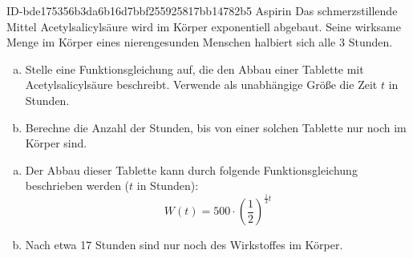 \begin{exercise}
      {ID-bde175356b3da6b16d7bbf255925817bb14782b5}
      {Aspirin}
  \ifproblem\problem
    Das schmerzstillende Mittel Acetylsalicylsäure wird im Körper
    exponentiell abgebaut. Seine wirksame Menge im Körper eines
    nierengesunden Menschen halbiert sich alle 3 Stunden.
    \begin{enumerate}[a)]
      \item Stelle eine Funktionsgleichung auf, die den Abbau
            einer Tablette mit  Acetylsalicylsäure
            beschreibt. Verwende als unabhängige Größe die Zeit
            $t$ in Stunden.
      \item Berechne die Anzahl der Stunden, bis von einer
            solchen Tablette nur noch  im Körper sind.
    \end{enumerate}
  \fi
  \ifoutcome\outcome
    \begin{enumerate}[a)]
      \item Der Abbau dieser Tablette kann durch folgende
            Funktionsgleichung beschrieben werden ($t$ in Stunden):
            \begin{equation*}
              W(t)=500\cdot\left(\frac{1}{2}\right)^{\frac{1}{3}t}
            \end{equation*}
      \item Nach etwa \num{17} Stunden sind nur noch  des
            Wirkstoffes im Körper.
    \end{enumerate}
  \fi
\end{exercise}
